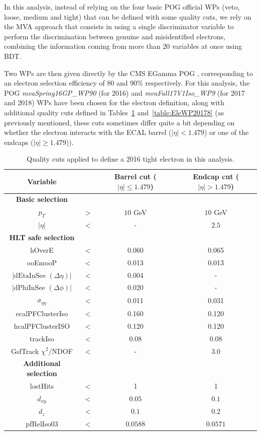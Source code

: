 \documentclass[a4paper, 10pt, openright]{report}
\begin{document}
In this analysis, instead of relying on the four basic \ac{POG} official \acp{WP} (veto, loose, medium and tight) that can be defined with some quality cuts, we rely on the \ac{MVA} approach that consists in using a single discriminator variable to perform the discrimination between genuine and misidentified electrons, combining the information coming from more than 20 variables at once using \ac{BDT}. 

Two \acp{WP} are then given directly by the \ac{CMS} EGamma \ac{POG} \cite{ElePOG}, corresponding to an electron selection efficiency of 80 and 90\% respectively. For this analysis, the \ac{POG} \textit{mvaSpring16GP\_WP90} (for 2016) and \textit{mvaFall17V1Iso\_WP9} (for 2017 and 2018) \acp{WP} have been chosen for the electron definition, along with additional quality cuts defined in Tables~\ref{table:EleWP2016} and~\ref{table:EleWP20178} (as previously mentioned, these cuts sometimes differ quite a bit depending on whether the electron interacts with the \ac{ECAL} barrel ($|\eta| < 1.479$) or one of the endcaps ($|\eta| \geq 1.479$)).

\begin{table}
\begin{center}
\begin{tabular}{ c|c|c|c } 
 \hline
 Variable & & Barrel cut ($|\eta| \leq 1.479$) & Endcap cut ($|\eta| > 1.479$) \\
\hline
\textbf{Basic selection} & &  \\ 
$p_T$ & $>$ & $10$ GeV & $10$ GeV \\
 $|\eta|$ & $<$ & - & $2.5$ \\
 \hline
\textbf{\ac{HLT} safe selection} & &  \\ 
hOverE & $<$ & 0.060 & 0.065 \\
 ooEmooP & $<$ & 0.013 & 0.013 \\
 $|\text{dEtaInSee } (\Delta \eta)|$ & $<$ & 0.004 & - \\  
 $|\text{dPhiInSee } (\Delta \phi)|$ & $<$ & 0.020 & - \\  
  $\sigma_{\eta \eta}$ & $<$ & 0.011 & 0.031 \\
  ecalPFClusterIso & $<$ & 0.160 & 0.120 \\
  hcalPFClusterISO & $<$ & 0.120 & 0.120 \\
  trackIso & $<$ & 0.08 & 0.08 \\
  GsfTrack $\chi^2$/NDOF & $<$ & - & 3.0 \\
 	\hline
 	\textbf{Additional selection} & &  \\ 
 lostHits & $<$ & 1 & 1 \\
 $d_{xy}$ & $<$ &  $0.05$ & $0.1$ \\
 $d_z$ & $<$ & $0.1$ & $0.2$ \\
 pfRelIso03 & $<$ & $0.0588$ & $0.0571$ \\
\hline
\end{tabular}
\caption{Quality cuts applied to define a 2016 tight electron in this analysis.}
\label{table:EleWP2016}
\end{center}
\end{table}	
\end{document}
